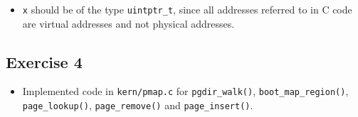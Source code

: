 \documentclass[]{article}
\begin{document}
\begin{itemize}
\itemsep1pt\parskip0pt
\item
  \texttt{x} should be of the type \texttt{uintptr\_t}, since all
  addresses referred to in C code are virtual addresses and not physical
  addresses.
\end{itemize}

\subsection{Exercise 4}

\begin{itemize}
\itemsep1pt\parskip0pt
\item
  Implemented code in \texttt{kern/pmap.c} for \texttt{pgdir\_walk()},
  \texttt{boot\_map\_region()}, \texttt{page\_lookup()},
  \texttt{page\_remove()} and \texttt{page\_insert()}.
\end{itemize}
\end{document}
